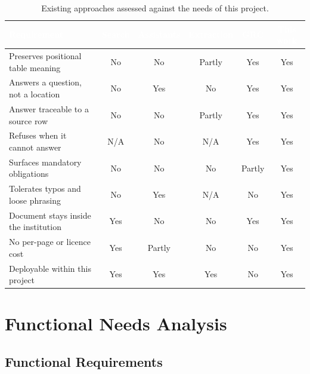 \begin{table}[h]
\centering
\caption{Existing approaches assessed against the needs of this project.}
\label{tab:existing}
\small
\begin{tabular}{|p{}|c|c|c|c|c|}
\hline
\rowcolor{myblue}
\textcolor{white}{\textbf{Requirement}} &
\textcolor{white}{\textbf{Search}} &
\textcolor{white}{\textbf{Assistants}} &
\textcolor{white}{\textbf{Extraction}} &
\textcolor{white}{\textbf{GRC}} &
\textcolor{white}{\textbf{This work}} \\
\hline
Preserves positional table meaning & No & No & Partly & Yes & Yes \\ \hline
Answers a question, not a location & No & Yes & No & Yes & Yes \\ \hline
Answer traceable to a source row & No & No & Partly & Yes & Yes \\ \hline
Refuses when it cannot answer & N/A & No & N/A & Yes & Yes \\ \hline
Surfaces mandatory obligations & No & No & No & Partly & Yes \\ \hline
Tolerates typos and loose phrasing & No & Yes & N/A & No & Yes \\ \hline
Document stays inside the institution & Yes & No & No & Yes & Yes \\ \hline
No per-page or licence cost & Yes & Partly & No & No & Yes \\ \hline
Deployable within this project & Yes & Yes & Yes & No & Yes \\ \hline
\end{tabular}
\end{table}


\section{Functional Needs Analysis}


\subsection{Functional Requirements}


